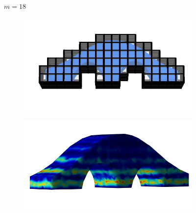 \documentclass[11pt,titlepage]{article}
\begin{document}
\begin{figure}[!htbp]
\begin{center}
        $m=18$
        \quad
        \begin{subfigure}[b]{0.4\textwidth}
            \centering
            \includegraphics[width=\textwidth]{hex/resized/archbridge_cage_2}
        \end{subfigure}
        \begin{subfigure}[b]{0.35\textwidth}
            \centering
            \includegraphics[width=\textwidth]{hex/resized/archbridge_2}
        \end{subfigure}\\ 



\end{center}
\end{figure}
\end{document}
